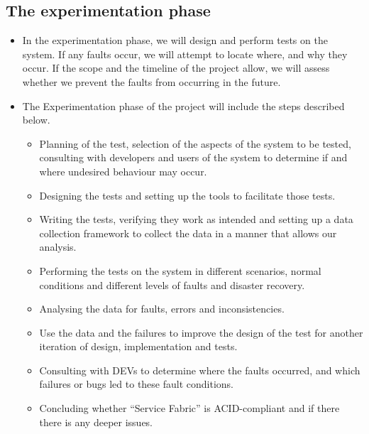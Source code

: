 \subsection{The experimentation phase}
\begin{itemize}
\item	In the experimentation phase, we will design and perform tests on the system. If any faults occur, we will attempt to locate where, and why they occur. If the scope and the timeline of the project allow, we will assess whether we prevent the faults from occurring in the future.
\item	The Experimentation phase of the project will include the steps described below. 
\begin{itemize}
\item	Planning of the test, selection of the aspects of the system to be tested, consulting with developers and users of the system to determine if and where undesired behaviour may occur.
\item	Designing the tests and setting up the tools to facilitate those tests.
\item	Writing the tests, verifying they work as intended and setting up a data collection framework to collect the data in a manner that allows our analysis.
\item	Performing the tests on the system in different scenarios, normal conditions and different levels of faults and disaster recovery.
\item	Analysing the data for faults, errors and inconsistencies.
\item Use the data and the failures to improve the design of the test for another iteration of design, implementation and tests.
\item	Consulting with DEVs to determine where the faults occurred, and which failures or bugs led to these fault conditions.
\item	Concluding whether “Service Fabric” is ACID-compliant and if there there is any deeper issues.
\end{itemize}
\end{itemize}

